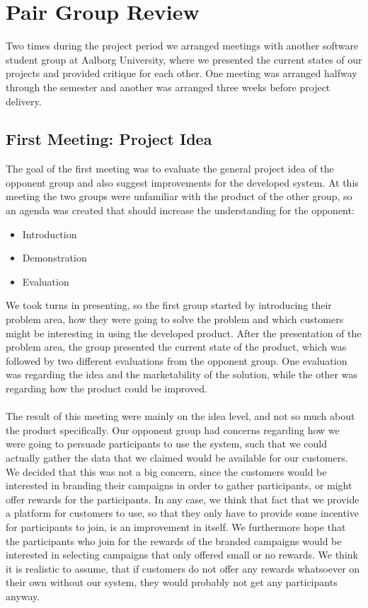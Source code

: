 
\section{Pair Group Review}
\label{sec:pair_group_review}

Two times during the project period we arranged meetings with another software student group at Aalborg University, where we presented the current states of our projects and provided critique for each other. One meeting was arranged halfway through the semester and another was arranged three weeks before project delivery. 

\subsection{First Meeting: Project Idea}
\label{sub:first_meeting_project_idea}
The goal of the first meeting was to evaluate the general project idea of the opponent group and also suggest improvements for the developed system. At this meeting the two groups were unfamiliar with the product of the other group, so an agenda was created that should increase the understanding for the opponent:

\begin{itemize}
    \item Introduction
    \item Demonstration
    \item Evaluation
\end{itemize}

We took turns in presenting, so the first group started by introducing their problem area, how they were going to solve the problem and which customers might be interesting in using the developed product. After the presentation of the problem area, the group presented the current state of the product, which was followed by two different evaluations from the opponent group. One evaluation was regarding the idea and the marketability of the solution, while the other was regarding how the product could be improved. 
\\\\
The result of this meeting were mainly on the idea level, and not so much about the product specifically. Our opponent group had concerns regarding how we were going to persuade participants to use the system, such that we could actually gather the data that we claimed would be available for our customers. We decided that this was not a big concern, since the customers would be interested in branding their campaigns in order to gather participants, or might offer rewards for the participants. In any case, we think that fact that we provide a platform for customers to use, so that they only have to provide some incentive for participants to join, is an improvement in itself. We furthermore hope that the participants who join for the rewards of the branded campaigns would be interested in selecting campaigns that only offered small or no rewards. We think it is realistic to assume, that if customers do not offer any rewards whatsoever on their own without our system, they would probably not get any participants anyway. 

